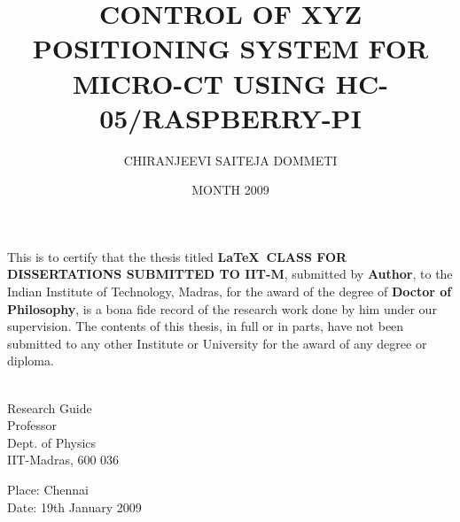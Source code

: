 \documentclass[MTech]{iitmdiss}
\begin{document}

\title{CONTROL OF XYZ POSITIONING SYSTEM FOR MICRO-CT USING HC-05/RASPBERRY-PI
}

\author{CHIRANJEEVI SAITEJA DOMMETI}

\date{MONTH 2009}

\maketitle

\certificate

\vspace*{0.5in}

\noindent This is to certify that the thesis titled {\bf \LaTeX\ CLASS  
  FOR DISSERTATIONS SUBMITTED TO IIT-M}, submitted by {\bf Author}, 
  to the Indian Institute of Technology, Madras, for
the award of the degree of {\bf Doctor of Philosophy}, is a bona fide
record of the research work done by him under our supervision.  The
contents of this thesis, in full or in parts, have not been submitted
to any other Institute or University for the award of any degree or
diploma.

\vspace*{1.5in}

\begin{singlespacing}
\hspace*{-0.25in}
\parbox{2.5in}{
 \\
\noindent Research Guide \\ 
\noindent Professor \\
\noindent Dept. of Physics\\
\noindent IIT-Madras, 600 036 \\
} 
\hspace*{1.0in} 
\end{singlespacing}
\vspace*{0.25in}
\noindent Place: Chennai\\
Date: 19th January 2009 
\end{document}
